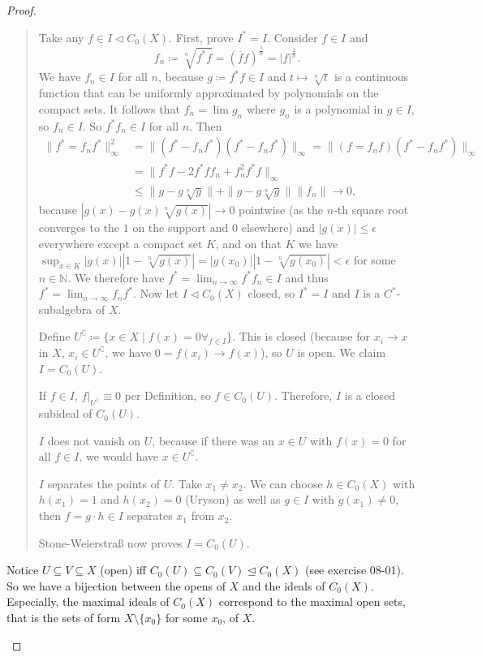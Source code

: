 \documentclass[a4paper]{article}
\begin{document}
\begin{proof}
\begin{itemize}
\begin{quote}
			Take any $f \in I \triangleleft C_0(X)$.
			First, prove $I^* = I$.
			Consider $f \in I$ and 
			\begin{equation*}
				f_n \coloneq \sqrt[n]{f^* f} = (\overline{f} f )^{\frac{1}{n}} = |f|^{\frac{2}{n}}\text{.}
			\end{equation*}
			We have $f_n \in I$ for all $n$, because $g \coloneq f^* f \in I$ and $t \mapsto \sqrt[n]{t}$ is a continuous function that can be uniformly approximated by polynomials on the compact sets.
			It follows that $f_n = \lim g_n$ where $g_n$ is a polynomial in $g \in I$, so $f_n \in I$.
			So $f^* f_n \in I$ for all $n$.
			Then
			\begin{align*}
				\|f^* = f_n f^*\|_\infty^2 &= \|(f^* - f_n f^*)(f^* - f_n f^*)\|_\infty = \|(f = f_n f)(f^* - f_n f^*)\|_\infty\\ &= \| f^* f - 2 f^* f f_n + f_n^2 f^* f\|_\infty \\ &\leq \|g - g \sqrt[n]{g}\| + \|g - g \sqrt[n]{g} \| \|f_n\| \to 0\text{,}
			\end{align*}
			because $|g(x) - g(x) \sqrt[n]{g(x)}| \to 0$ pointwise (as the $n$-th square root converges to the $1$ on the support and $0$ elsewhere) and $|g(x)| \leq \epsilon$ everywhere except a compact set $K$, and on that $K$ we have $\sup_{x \in K} |g(x)| |1 - \sqrt[n]{g(x)}| = |g(x_0)| |1 - \sqrt[n]{g(x_0)}| < \epsilon$ for some $n \in \mathds{N}$.
			We therefore have $f^* = \lim_{n \to \infty} f^* f_n \in I$ and thus $f^* = \lim_{n \to \infty} f_n f^*$. 
			Now let $I \triangleleft C_0(X)$ closed, so $I^* = I$ and $I$ is a $C^*$-subalgebra of $X$.

			Define $U^\complement \coloneq \{x \in X \mid f(x) = 0 \forall_{f \in I} \}$.
			This is closed (because for $x_i \to x$ in $X$, $x_i \in U^\complement$, we have $0 = f(x_i) \to f(x)$), so $U$ is open. 
			We claim $I = C_0(U)$. 
			
			If $f \in I$, $f|_{U^\complement} \equiv 0$ per Definition, so $f \in C_0(U)$. Therefore, $I$ is a closed subideal of $C_0(U)$. 

			$I$ does not vanish on $U$, because if there was an $x \in U$ with $f(x) = 0$ for all $f \in I$, we would have $x \in U^\complement$.

			$I$ separates the points of $U$. Take $x_1 \neq x_2$. We can choose $h \in C_0(X)$ with $h(x_1) = 1$ and $h(x_2) = 0$ (Uryson) as well as $g \in I$ with $g(x_1) \neq 0$, then $f = g \cdot h \in I$ separates $x_1$ from $x_2$.

			Stone-Weierstraß now proves $I = C_0(U)$.
		\end{quote}
		Notice $U \subseteq V \subseteq X$ (open) iff $C_0(U) \subseteq C_0(V) \trianglelefteq C_0(X)$ (see exercise 08-01).
		So we have a bijection between the opens of $X$ and the ideals of $C_0(X)$.
		Especially, the maximal ideals of $C_0(X)$ correspond to the maximal open sets, that is the sets of form $X \setminus \{x_0\}$ for some $x_0$, of $X$.


\end{itemize}
\end{proof}
\end{document}
